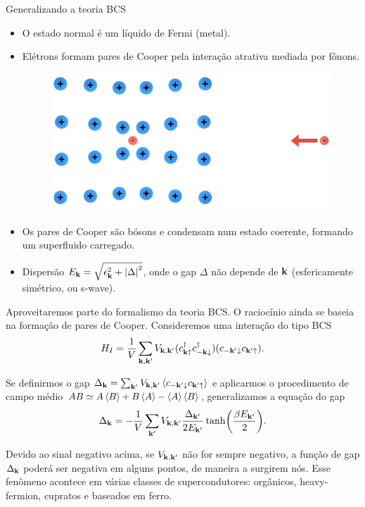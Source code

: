 \documentclass[a4paper,10pt]{article}
\begin{document}


\begin{section}{Generalizando a teoria BCS}

\begin{itemize}
\item O estado normal é um líquido de Fermi (metal).

\item Elétrons formam pares de Cooper pela interação atrativa mediada por fônons.

\n

\begin{figure}[H]
\centering
\includegraphics[width=0.5\linewidth]{fig/phonon.png}
\label{fig:phonon}
\end{figure}

\n

\item Os pares de Cooper são bósons e condensam num estado coerente, formando um superfluido carregado.

\item Dispersão $E_{\vb{k}} = \sqrt{\epsilon_{\vb{k}}^2 + \abs{\Delta}^2}$, onde o gap $\Delta$ não depende de $\vb{k}$ (esfericamente simétrico, ou s-wave).
\end{itemize}



Aproveitaremos parte do formalismo da teoria BCS. O raciocínio ainda se baseia na formação de pares de Cooper. Consideremos uma interação do tipo BCS
$$
H_I =
\frac{1}{V} \sum_{\vb{k},\vb{k}'} V_{\vb{k},\vb{k}'} (c_{\vb{k}\uparrow}^\dagger c_{-\vb{k}\downarrow}^\dagger) (c_{-\vb{k}'\downarrow} c_{\vb{k}'\uparrow}).
$$

Se definirmos o gap $\Delta_{\k} = \sum_{\k'} V_{\k,\k'} \ev{c_{-\k'\down} c_{\k'\up}}$ e aplicarmos o procedimento de campo médio $AB \simeq A\ev{B} + B\ev{A} - \ev{A}\ev{B}$, generalizamos a equação do gap
\begin{equation} \label{eq:gapeq}
\Delta_{\vb{k}} = - \frac{1}{V} \sum_{\vb{k}'} V_{\vb{k},\vb{k}'} \frac{\Delta_{\vb{k}'}}{2 E_{\vb{k}'}} \tanh(\frac{\beta E_{\vb{k}'}}{2}).
\end{equation}

Devido ao sinal negativo acima, se $V_{\vb{k},\vb{k}'}$ não for sempre negativo, a função de gap $\Delta_{\vb{k}}$ poderá ser negativa em alguns pontos, de maneira a surgirem nós. Esse fenômeno acontece em várias classes de supercondutores: orgânicos, heavy-fermion, cupratos e baseados em ferro.

\end{section}
\end{document}
